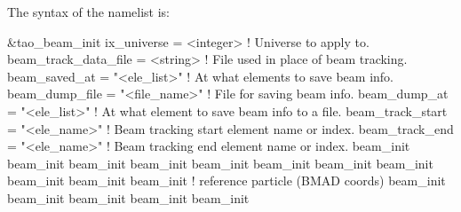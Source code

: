{{{{{{{{{The syntax of the  namelist is:
\begin{example}
  &tao_beam_init
    ix_universe                 = <integer>     ! Universe to apply to.
    beam_track_data_file        = <string>      ! File used in place of beam tracking.
    beam_saved_at               = "<ele_list>"  ! At what elements to save beam info.
    beam_dump_file              = "<file_name>" ! File for saving beam info.
    beam_dump_at                = "<ele_list>"  ! At what element to save beam info to a file.
    beam_track_start            = "<ele_name>"  ! Beam tracking start element name or index.
    beam_track_end              = "<ele_name>"  ! Beam tracking end element name or index.
    beam_init%
    beam_init%
    beam_init%
    beam_init%
    beam_init%
    beam_init%
    beam_init%
    beam_init%
    beam_init%
    beam_init%
    beam_init%
                                                !   reference particle (BMAD coords)
    beam_init%
    beam_init%
    beam_init%
    beam_init%
    beam_init%

\end{example}}}}}}}}}}
